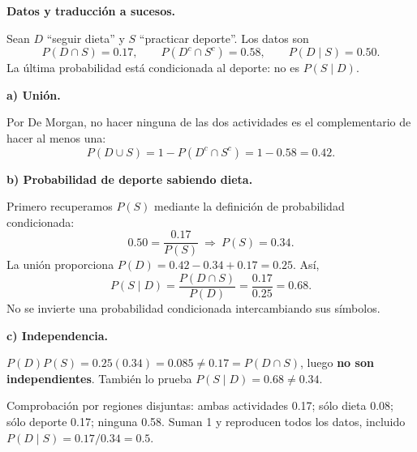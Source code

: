 \textbf{Datos y traducción a sucesos.}\par\nopagebreak[4]
Sean $D$ ``seguir dieta'' y $S$ ``practicar deporte''. Los datos son
\[
P(D\cap S)=0.17,\qquad P(D^c\cap S^c)=0.58,\qquad P(D\mid S)=0.50.
\]
La última probabilidad está condicionada al deporte: no es $P(S\mid D)$.

\textbf{a) Unión.}\par\nopagebreak[4]
Por De Morgan, no hacer ninguna de las dos actividades es el complementario de hacer al menos una:
\[
P(D\cup S)=1-P(D^c\cap S^c)=1-0.58=\boxed{0.42}.
\]

\textbf{b) Probabilidad de deporte sabiendo dieta.}\par\nopagebreak[4]
Primero recuperamos $P(S)$ mediante la definición de probabilidad condicionada:
\[
0.50=\frac{0.17}{P(S)}\ \Longrightarrow\ P(S)=0.34.
\]
La unión proporciona $P(D)=0.42-0.34+0.17=0.25$. Así,
\[
P(S\mid D)=\frac{P(D\cap S)}{P(D)}=\frac{0.17}{0.25}=\boxed{0.68}.
\]
No se invierte una probabilidad condicionada intercambiando sus símbolos.

\textbf{c) Independencia.}\par\nopagebreak[4]
$P(D)P(S)=0.25(0.34)=0.085\ne0.17=P(D\cap S)$, luego \textbf{no son independientes}. También lo prueba $P(S\mid D)=0.68\ne0.34$.

Comprobación por regiones disjuntas: ambas actividades 0.17; sólo dieta 0.08; sólo deporte 0.17; ninguna 0.58. Suman 1 y reproducen todos los datos, incluido $P(D\mid S)=0.17/0.34=0.5$.
